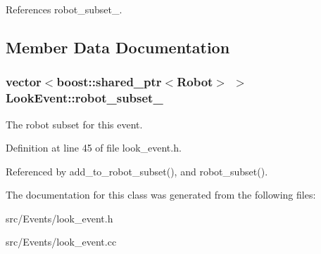 References robot\_\-subset\_\-.

\subsection{Member Data Documentation}
\hypertarget{class_look_event_a01e6d88edc4ae67bd1db1632eafb55f}{
\subsubsection[robot\_\-subset\_\-]{\setlength{\rightskip}{0pt plus 5cm}vector$<$boost::shared\_\-ptr$<$Robot$>$ $>$ {\bf LookEvent::robot\_\-subset\_\-}}}
\label{class_look_event_a01e6d88edc4ae67bd1db1632eafb55f}


The robot subset for this event. 

Definition at line 45 of file look\_\-event.h.

Referenced by add\_\-to\_\-robot\_\-subset(), and robot\_\-subset().

The documentation for this class was generated from the following files:\begin{CompactItemize}
\item 
src/Events/look\_\-event.h\item 
src/Events/look\_\-event.cc\end{CompactItemize}
